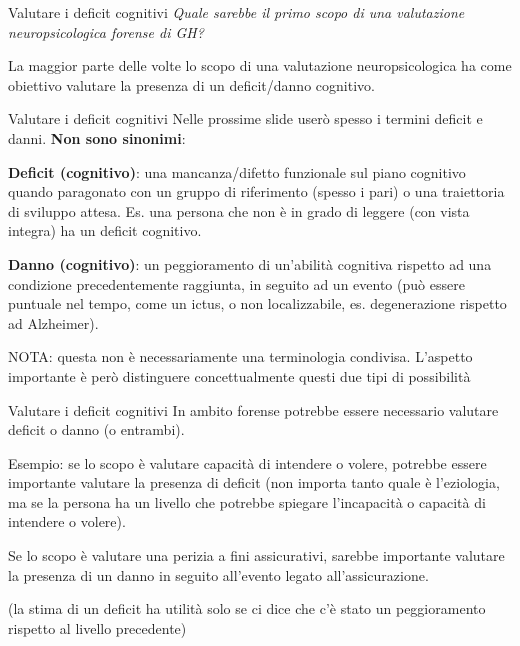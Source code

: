 \documentclass[
  ignorenonframetext,
]{beamer}
\begin{document}
\begin{frame}{Valutare i deficit cognitivi}
\label{valutare-i-deficit-cognitivi}
\emph{Quale sarebbe il primo scopo di una valutazione neuropsicologica
forense di GH?} \vspace{2em}

La maggior parte delle volte lo scopo di una valutazione
neuropsicologica ha come obiettivo valutare la presenza di un
deficit/danno cognitivo.
\end{frame}

\begin{frame}{Valutare i deficit cognitivi}
\label{valutare-i-deficit-cognitivi-1}
Nelle prossime slide userò spesso i termini deficit e danni. \textbf{Non
sono sinonimi}:

\textbf{Deficit (cognitivo)}: una mancanza/difetto funzionale sul piano
cognitivo quando paragonato con un gruppo di riferimento (spesso i pari)
o una traiettoria di sviluppo attesa. Es. una persona che non è in grado
di leggere (con vista integra) ha un deficit cognitivo.

\textbf{Danno (cognitivo)}: un peggioramento di un'abilità cognitiva
rispetto ad una condizione precedentemente raggiunta, in seguito ad un
evento (può essere puntuale nel tempo, come un ictus, o non
localizzabile, es. degenerazione rispetto ad Alzheimer). \vspace{2em}

NOTA: questa non è necessariamente una terminologia condivisa. L'aspetto
importante è però distinguere concettualmente questi due tipi di
possibilità
\end{frame}

\begin{frame}{Valutare i deficit cognitivi}
\label{valutare-i-deficit-cognitivi-2}
In ambito forense potrebbe essere necessario valutare deficit o danno (o
entrambi).

Esempio: se lo scopo è valutare capacità di intendere o volere, potrebbe
essere importante valutare la presenza di deficit (non importa tanto
quale è l'eziologia, ma se la persona ha un livello che potrebbe
spiegare l'incapacità o capacità di intendere o volere).

Se lo scopo è valutare una perizia a fini assicurativi, sarebbe
importante valutare la presenza di un danno in seguito all'evento legato
all'assicurazione.

(la stima di un deficit ha utilità solo se ci dice che c'è stato un
peggioramento rispetto al livello precedente)
\end{frame}
\end{document}
